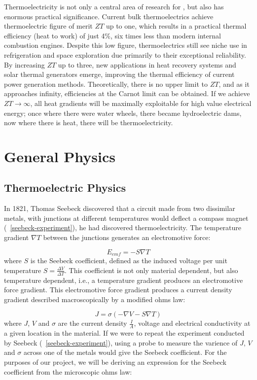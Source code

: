 \documentclass[a4paper,10pt,journal]{IEEEtran}
\newcommand{\figref}[2][\figurename~]{#1\ref{#2}}
\begin{document}
Thermoelectricity is not only a central area of research for
, but also has enormous practical significance. Current
bulk thermoelectrics achieve thermoelectric figure of merit $ZT$ up to
one, which results in a practical thermal efficiency (heat to work) of
just 4\%, six times less than modern internal combustion engines.
Despite this low figure, thermoelectrics still see niche use
in refrigeration and space exploration due primarily to their
exceptional reliability. By increasing $ZT$ up to three, new
applications in heat recovery systems and solar thermal generators
emerge, improving the thermal efficiency of current power generation
methods. Theoretically, there is no upper limit to $ZT$, and as it
approaches infinity, efficiencies at the Carnot limit can be obtained.
If we achieve $ZT \to\infty$, all heat gradients will be maximally
exploitable for high value electrical energy; once where there were
water wheels, there became hydroelectric dams, now where there is
heat, there will be thermoelectricity.

\section{General Physics}
\subsection{Thermoelectric Physics}
In 1821, Thomas Seebeck discovered that a circuit made from two
dissimilar metals, with junctions at different temperatures would
deflect a compass magnet (\figref{seebeck-experiment}), he had
discovered thermoelectricity. The temperature gradient $\nabla
T$ between the junctions generates an electromotive force:

\begin{equation}
\label{seebeck-emf}
	E_{emf} = -S \nabla T
\end{equation}
where $S$ is the Seebeck coefficient, defined as the induced voltage per
unit temperature $S = \frac{\Delta V}{\Delta T}$. This coefficient is
not only material dependent, but also temperature dependent, i.e., a
temperature gradient produces an electromotive force gradient. This
electromotive force gradient produces a current density gradient
described macroscopically by a modified ohms law:

\begin{equation}
\label{current-density}
	J = \sigma (-\nabla V - S \nabla T)
\end{equation}
where $J$, $V$ and $\sigma$ are the current density $\frac{I}{A}$,
voltage and electrical conductivity at a given location in the
material. If we were to repeat the experiment conducted by Seebeck
(\figref{seebeck-experiment}), using a probe to measure the varience
of $J$, $V$ and $\sigma$ across one of the metals would give the
Seebeck coefficient.
For the purposes of our project, we will be deriving an expression for
the Seebeck coefficient from the microscopic ohms law:
\end{document}
